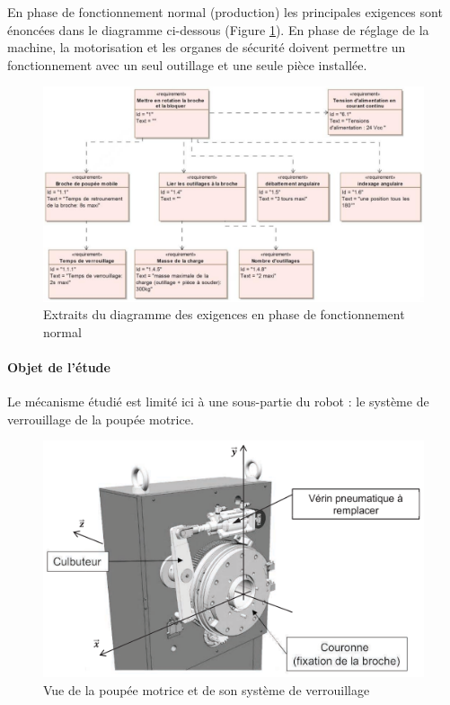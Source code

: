 En phase de fonctionnement normal (production) les principales exigences sont énoncées dans le diagramme ci-dessous (Figure \ref{img04}). En phase de réglage de la machine, la motorisation et les organes de sécurité doivent permettre un fonctionnement avec un seul outillage et une seule pièce installée.

\begin{figure}[!h]
\centering\includegraphics[width=0.9\linewidth]{img/fig04}
 \caption{Extraits du diagramme des exigences en phase de fonctionnement normal}
 \label{img04}
\end{figure}

\paragraph{Objet de l’étude}

Le mécanisme étudié est limité ici à une sous-partie du robot : le système de verrouillage de la poupée motrice.

\begin{figure}[!h]
\centering\includegraphics[width=0.6\linewidth]{img/fig05}
 \caption{Vue de la poupée motrice et de son système de verrouillage}
 \label{img05}
\end{figure}

